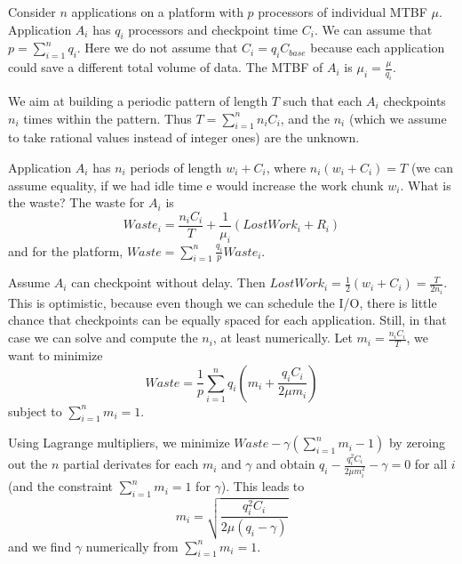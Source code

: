 \documentclass{article}
\begin{document}
Consider $n$ applications on a platform with $p$ processors of individual MTBF $\mu$.
 Application $A_{i}$ has $q_{i}$ processors and checkpoint time $C_{i}$. We can
 assume that $p = \sum_{i=1}^{n} q_{i}$.
Here we do not assume that $C_{i} = q_{i} C_{\textit{base}}$ because each application could save a different total volume of data. The MTBF of $A_{i}$ is $\mu_{i} = \frac{\mu}{q_{i}}$.

We aim at building a periodic pattern of length $T$ such that each $A_{i}$ checkpoints $n_{i}$ times
within the pattern. Thus $T  = \sum_{i=1}^{n} n_{i} C_{i}$, and the $n_{i}$ (which we assume
to take rational values instead of integer ones) are the unknown. 

Application $A_{i}$ has $n_{i}$ periods of length $w_{i}+C_{i}$, where $n_{i} (w_{i}+C_{i})=T$
(we can assume equality, if we had idle time e would increase the work chunk $w_{i}$.
What is the waste? The waste for $A_{i}$ is 
$$Waste_{i} = \frac{n_{i} C_{i}}{T} + \frac{1}{\mu_{i}} (LostWork_{i} + R_{i})$$
and for the platform, $Waste = \sum_{i=1}^{n} \frac{q_{i}}{p} Waste_{i}$.


Assume $A_{i}$ can checkpoint without delay. Then $LostWork_{i} = \frac{1}{2} (w_{i}+C_{i}) = \frac{T}{2n_{i}}$.
This is  optimistic, because even though we can schedule the I/O, there is little chance that checkpoints can be equally spaced for each application.
Still, in that case we can solve and compute the $n_{i}$, at least numerically. Let $m_{i} =  \frac{n_{i} C_{i}}{T}$, we want to minimize 
$$Waste = \frac{1}{p} \sum_{i=1}^{n} q_{i} (m_{i} +  \frac{q_{i} C_{i}}{2 \mu m_{i}})$$ 
subject to $\sum_{i=1}^{n} m_{i} = 1$.

Using Lagrange multipliers, we minimize $Waste - \gamma (\sum_{i=1}^{n} m_{i} - 1)$
by zeroing out the $n$ partial derivates for each $m_{i}$ and $\gamma$ and obtain
$q_{i} - \frac{q_{i}^{2} C_{i}}{2 \mu m_{i}^{2}} - \gamma = 0$ for all $i$ (and the constraint
$\sum_{i=1}^{n} m_{i} = 1$ for $\gamma$). This leads to 
$$m_{i} = \sqrt{\frac{q_{i}^{2} C_{i}}{2 \mu (q_{i} - \gamma)}}$$
and we find $\gamma$ numerically from $\sum_{i=1}^{n} m_{i} = 1$.
\end{document}
